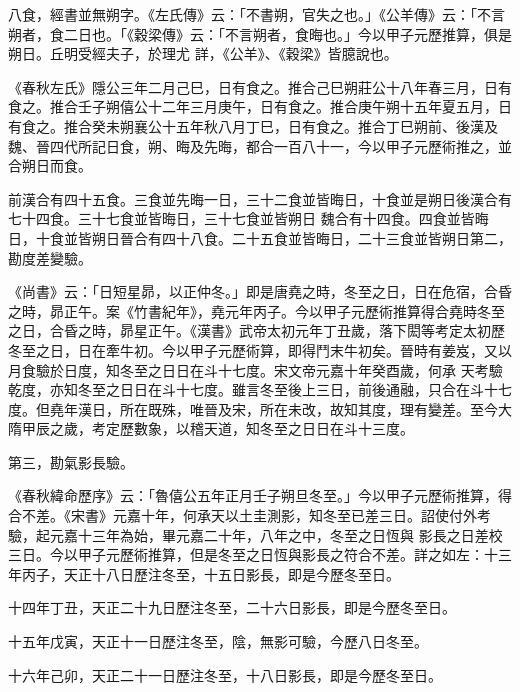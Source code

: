 \begin{pinyinscope}
 八食，經書並無朔字。《左氏傳》云：「不書朔，官失之也。」《公羊傳》云：「不言朔者，食二日也。「《穀梁傳》云：「不言朔者，食晦也。」今以甲子元歷推算，俱是朔日。丘明受經夫子，於理尤
 詳，《公羊》、《穀梁》皆臆說也。



 《春秋左氏》隱公三年二月己巳，日有食之。推合己巳朔莊公十八年春三月，日有食之。推合壬子朔僖公十二年三月庚午，日有食之。推合庚午朔十五年夏五月，日有食之。推合癸未朔襄公十五年秋八月丁巳，日有食之。推合丁巳朔前、後漢及魏、晉四代所記日食，朔、晦及先晦，都合一百八十一，今以甲子元歷術推之，並合朔日而食。



 前漢合有四十五食。三食並先晦一日，三十二食並皆晦日，十食並是朔日後漢合有七十四食。三十七食並皆晦日，三十七食並皆朔日
 魏合有十四食。四食並皆晦日，十食並皆朔日晉合有四十八食。二十五食並皆晦日，二十三食並皆朔日第二，勘度差變驗。



 《尚書》云：「日短星昴，以正仲冬。」即是唐堯之時，冬至之日，日在危宿，合昏之時，昴正午。案《竹書紀年》，堯元年丙子。今以甲子元歷術推算得合堯時冬至之日，合昏之時，昴星正午。《漢書》武帝太初元年丁丑歲，落下閎等考定太初歷冬至之日，日在牽牛初。今以甲子元歷術算，即得鬥末牛初矣。晉時有姜岌，又以月食驗於日度，知冬至之日日在斗十七度。宋文帝元嘉十年癸酉歲，何承
 天考驗乾度，亦知冬至之日日在斗十七度。雖言冬至後上三日，前後通融，只合在斗十七度。但堯年漢日，所在既殊，唯晉及宋，所在未改，故知其度，理有變差。至今大隋甲辰之歲，考定歷數象，以稽天道，知冬至之日日在斗十三度。



 第三，勘氣影長驗。



 《春秋緯命歷序》云：「魯僖公五年正月壬子朔旦冬至。」今以甲子元歷術推算，得合不差。《宋書》元嘉十年，何承天以土圭測影，知冬至已差三日。詔使付外考驗，起元嘉十三年為始，畢元嘉二十年，八年之中，冬至之日恆與
 影長之日差校三日。今以甲子元歷術推算，但是冬至之日恆與影長之符合不差。詳之如左：十三年丙子，天正十八日歷注冬至，十五日影長，即是今歷冬至日。



 十四年丁丑，天正二十九日歷注冬至，二十六日影長，即是今歷冬至日。



 十五年戊寅，天正十一日歷注冬至，陰，無影可驗，今歷八日冬至。



 十六年己卯，天正二十一日歷注冬至，十八日影長，即是今歷冬至日。




\end{pinyinscope}
